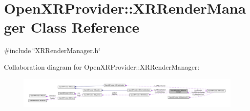 \hypertarget{class_open_x_r_provider_1_1_x_r_render_manager}{}\section{Open\+X\+R\+Provider\+::X\+R\+Render\+Manager Class Reference}
\label{class_open_x_r_provider_1_1_x_r_render_manager}


{\ttfamily \#include \char`\"{}X\+R\+Render\+Manager.\+h\char`\"{}}



Collaboration diagram for Open\+X\+R\+Provider\+::X\+R\+Render\+Manager\+:\nopagebreak
\begin{figure}[H]
\begin{center}
\leavevmode
\includegraphics[width=350pt]{class_open_x_r_provider_1_1_x_r_render_manager__coll__graph}
\end{center}
\end{figure}

